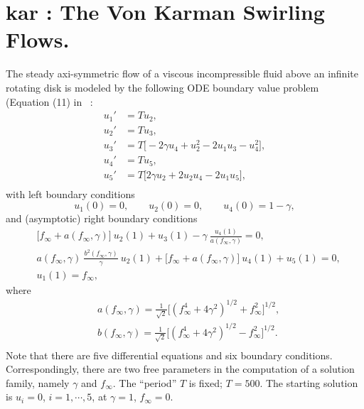 \documentclass[12pt]{report}
\begin{document}
\section{ kar : The Von Karman Swirling Flows.} \label{sec:Demos_kar}
The steady axi-symmetric flow of a viscous incompressible fluid
above an infinite rotating disk is modeled by the following 
ODE boundary value problem (Equation (11) in
 \citeyear{LeKe:80}~:
\begin{equation} \begin{array}{cl}
  u_1' &= T u_2,  \\
  u_2' &= T u_3,  \\
  u_3' &= T \bigl[ -2 \gamma u_4 + u_2^2 - 2 u_1 u_3 - u_4^2 \bigr], \\
  u_4' &= T u_5, \\
  u_5' &= T \bigl[ 2 \gamma u_2 + 2 u_2 u_4 - 2 u_1 u_5 \bigr], \\
\end{array} \end{equation}
with left boundary conditions
$$ u_1(0)=0, \qquad u_2(0)=0, \qquad u_4(0)=1-\gamma, $$
and (asymptotic) right boundary conditions
\begin{equation} \begin{array}{cl}
  & \bigl[ f_\infty + a(f_\infty,\gamma) \bigr] ~ u_2(1) + u_3(1)
  - \gamma ~ \frac{ u_4(1) }{ a(f_\infty,\gamma) } = 0,  \\
  & a(f_\infty,\gamma)~ \frac{ b^2(f_\infty,\gamma) }{ \gamma } ~u_2(1)
  + \bigl[ f_\infty + a(f_\infty,\gamma) \bigr] ~u_4(1) 
  + u_5(1) = 0, \\
 & u_1(1) = f_\infty,
 \end{array} \end{equation}
where
\begin{equation} \begin{array}{cl}
 & a(f_\infty,\gamma) = \frac{1 }{ \sqrt{2} }
  \bigl[ (f_\infty^4 + 4 \gamma^2)^{1/2} + f_\infty^2 \bigr]^{1/2}, \\
 & b(f_\infty,\gamma) = \frac{1 }{ \sqrt{2} }
  \bigl[ (f_\infty^4 + 4 \gamma^2)^{1/2} - f_\infty^2 \bigr]^{1/2}.  \\
\end{array} \end{equation}
Note that there are five differential equations and six boundary conditions.
Correspondingly, there are two free parameters in the computation of a 
solution family, namely $\gamma$ and $f_\infty$.
The ``period'' $T$ is fixed; $T=500$.
The starting solution is $u_i=0$, $i=1,\cdots,5$, 
at $\gamma=1$, $f_\infty=0$.
\end{document}
